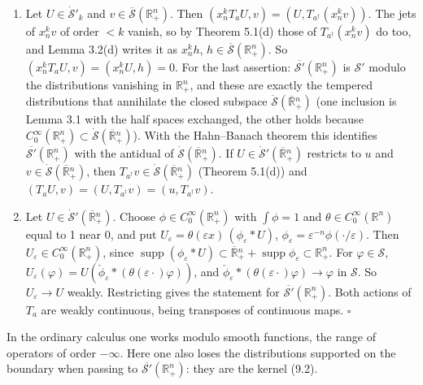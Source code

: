 \documentclass[
  11pt,
]{article}
\begin{document}
\begin{enumerate}
\def\labelenumi{(\alph{enumi})}
\setcounter{enumi}{3}
\item
  Let \(U\in\dot{\mathcal S}'_k\) and
  \(v\in\overline{\mathcal S}(\mathbb R^n_+)\). Then
  \((x_n^kT_aU,v)=(U,T_{a^\dagger}(x_n^kv))\). The jets of \(x_n^kv\) of
  order \(<k\) vanish, so by Theorem 5.1(d) those of
  \(T_{a^\dagger}(x_n^kv)\) do too, and Lemma 3.2(d) writes it as
  \(x_n^kh\), \(h\in\overline{\mathcal S}(\mathbb R^n_+)\). So
  \((x_n^kT_aU,v)=(x_n^kU,h)=0\). For the last assertion:
  \(\overline{\mathcal S'}(\mathbb R^n_+)\) is \(\mathcal S'\) modulo
  the distributions vanishing in \(\mathbb R^n_+\), and these are
  exactly the tempered distributions that annihilate the closed subspace
  \(\dot{\mathcal S}(\overline{\mathbb R}{}^n_+)\) (one inclusion is
  Lemma 3.1 with the half spaces exchanged, the other holds because
  \(C_0^\infty(\mathbb R^n_+)\subset\dot{\mathcal S}(\overline{\mathbb R}{}^n_+)\)).
  With the Hahn--Banach theorem this identifies
  \(\overline{\mathcal S'}(\mathbb R^n_+)\) with the antidual of
  \(\dot{\mathcal S}(\overline{\mathbb R}{}^n_+)\). If
  \(U\in\dot{\mathcal S}'(\overline{\mathbb R}{}^n_+)\) restricts to
  \(u\) and \(v\in\dot{\mathcal S}(\overline{\mathbb R}{}^n_+)\), then
  \(T_{a^\dagger}v\in\dot{\mathcal S}(\overline{\mathbb R}{}^n_+)\)
  (Theorem 5.1(d)) and
  \((T_aU,v)=(U,T_{a^\dagger}v)=(u,T_{a^\dagger}v)\).
\item
  Let \(U\in\dot{\mathcal S}'(\overline{\mathbb R}{}^n_+)\). Choose
  \(\phi\in C_0^\infty(\mathbb R^n_+)\) with \(\int\phi=1\) and
  \(\theta\in C_0^\infty(\mathbb R^n)\) equal to 1 near 0, and put
  \(U_\varepsilon=\theta(\varepsilon x)\,(\phi_\varepsilon*U)\),
  \(\phi_\varepsilon=\varepsilon^{-n}\phi(\cdot/\varepsilon)\). Then
  \(U_\varepsilon\in C_0^\infty(\mathbb R^n_+)\), since
  \(\operatorname{supp}(\phi_\varepsilon*U)\subset\overline{\mathbb R}{}^n_++\operatorname{supp}\phi_\varepsilon\subset\mathbb R^n_+\).
  For \(\varphi\in\mathcal S\),
  \(U_\varepsilon(\varphi)=U(\check\phi_\varepsilon*(\theta(\varepsilon\cdot)\varphi))\),
  and
  \(\check\phi_\varepsilon*(\theta(\varepsilon\cdot)\varphi)\to\varphi\)
  in \(\mathcal S\). So \(U_\varepsilon\to U\) weakly. Restricting gives
  the statement for \(\overline{\mathcal S'}(\mathbb R^n_+)\). Both
  actions of \(T_a\) are weakly continuous, being transposes of
  continuous maps. \(\square\)
\end{enumerate}

In the ordinary calculus one works modulo smooth functions, the range of
operators of order \(-\infty\). Here one also loses the distributions
supported on the boundary when passing to
\(\overline{\mathcal S'}(\mathbb R^n_+)\): they are the kernel (9.2).
\end{document}
